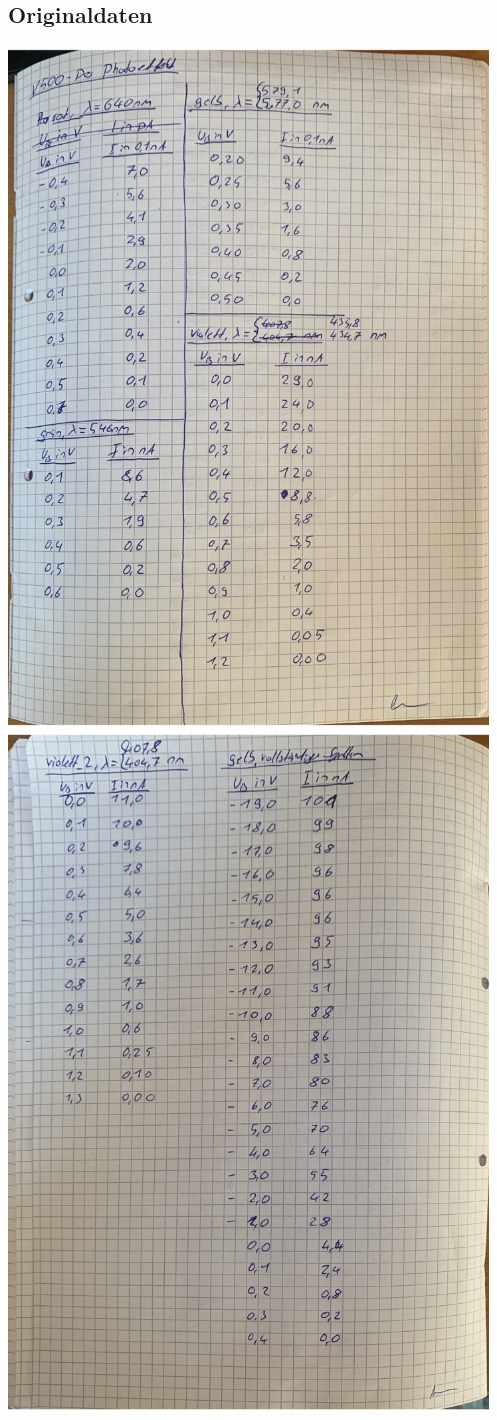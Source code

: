 \subsection{Originaldaten}
\centering
\includegraphics[height=18cm]{content/pics/originaldaten/Originaldaten_1.pdf}
\newpage
\centering
\includegraphics[height=18cm]{content/pics/originaldaten/Originaldaten_2.pdf}